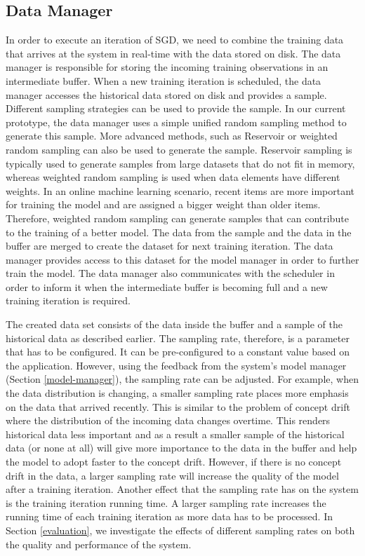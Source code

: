 \documentclass{vldb}
\begin{document}
\subsection{Data Manager} \label{data-manager}
In order to execute an iteration of SGD, we need to combine the training data that arrives at the system in real-time with the data stored on disk.
The data manager is responsible for storing the incoming training observations in an intermediate buffer.
{\color{green}When a new training iteration is scheduled, the data manager accesses the historical data stored on disk and provides a sample.
Different sampling strategies can be used to provide the sample.
In our current prototype, the data manager uses a simple unified random sampling method to generate this sample.
More advanced methods, such as Reservoir \cite{vitter1985random} or weighted random sampling can also be used to generate the sample.
Reservoir sampling is typically used to generate samples from large datasets that do not fit in memory, whereas weighted random sampling is used when data elements have different weights.
In an online machine learning scenario, recent items are more important for training the model and are assigned a bigger weight than older items.
Therefore, weighted random sampling can generate samples that can contribute to the training of a better model.}
The data from the sample and the data in the buffer are merged to create the dataset for next training iteration.
The data manager provides access to this dataset for the model manager in order to further train the model.
The data manager also communicates with the scheduler in order to inform it when the intermediate buffer is becoming full and a new training iteration is required. 

The created data set consists of the data inside the buffer and a sample of the historical data as described earlier.
The sampling rate, therefore, is a parameter that has to be configured.
It can be pre-configured to a constant value based on the application.
However, using the feedback from the system's model manager (Section \ref{model-manager}), the sampling rate can be adjusted.
For example, when the data distribution is changing, a smaller sampling rate places more emphasis on the data that arrived recently. 
This is similar to the problem of concept drift where the distribution of the incoming data changes overtime.
This renders historical data less important and as a result a smaller sample of the historical data (or none at all) will give more importance to the data in the buffer and help the model to adopt faster to the concept drift.
However, if there is no concept drift in the data, a larger sampling rate will increase the quality of the model after a training iteration.
Another effect that the sampling rate has on the system is the training iteration running time.
A larger sampling rate increases the running time of each training iteration as more data has to be processed.
In Section \ref{evaluation}, we investigate the effects of different sampling rates on both the quality and performance of the system.
\end{document}
